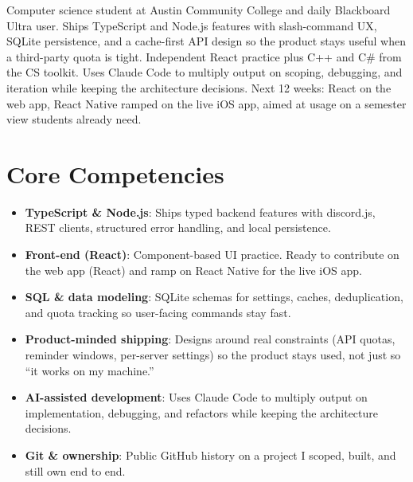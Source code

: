 \documentclass[11pt,a4paper,sans]{moderncv}
\begin{document}
\makecvtitle


\vspace{6pt}
\small{Computer science student at Austin Community College and daily Blackboard Ultra user. Ships TypeScript and Node.js features with slash-command UX, SQLite persistence, and a cache-first API design so the product stays useful when a third-party quota is tight. Independent React practice plus C++ and C\# from the CS toolkit. Uses Claude Code to multiply output on scoping, debugging, and iteration while keeping the architecture decisions. Next 12 weeks: React on the web app, React Native ramped on the live iOS app, aimed at usage on a semester view students already need.}


\section{Core Competencies}
\vspace{1pt}
\begin{itemize}

\item \textbf{TypeScript \& Node.js}: Ships typed backend features with discord.js, REST clients, structured error handling, and local persistence.

\item \textbf{Front-end (React)}: Component-based UI practice. Ready to contribute on the web app (React) and ramp on React Native for the live iOS app.

\item \textbf{SQL \& data modeling}: SQLite schemas for settings, caches, deduplication, and quota tracking so user-facing commands stay fast.

\item \textbf{Product-minded shipping}: Designs around real constraints (API quotas, reminder windows, per-server settings) so the product stays used, not just so ``it works on my machine.''

\item \textbf{AI-assisted development}: Uses Claude Code to multiply output on implementation, debugging, and refactors while keeping the architecture decisions.

\item \textbf{Git \& ownership}: Public GitHub history on a project I scoped, built, and still own end to end.

\end{itemize}
\end{document}
